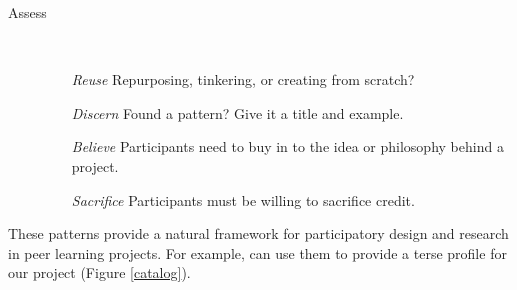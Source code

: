\documentclass{acm_proc_article-sp}
\begin{document}
\hspace{.2in}
\begin{minipage}{.4\textwidth}
\begin{description}
\item[Assess]  \quad \\[-.1in]
\begin{itemize}
\item[\emph{Reuse}] Repurposing, tinkering, or creating from scratch?
\item[\emph{Discern}] Found a pattern? Give it a title and example.
\item[\emph{Believe}] Participants need to buy in to the idea or philosophy behind a project.
\item[\emph{Sacrifice}] Participants must be willing to sacrifice credit.
\end{itemize}
\end{description}
\end{minipage}

These patterns provide a natural framework for participatory design
and research in peer learning projects.  For example, can use them to
provide a terse profile for our project (Figure \ref{catalog}).
\end{document}
